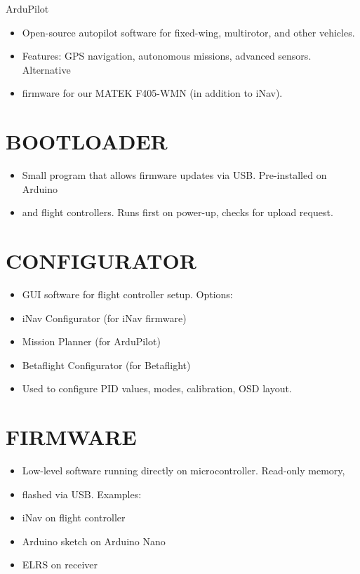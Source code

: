 \documentclass[11pt,letterpaper]{article}
\begin{document}
ArduPilot\par

\begin{itemize}
  \item Open-source autopilot software for fixed-wing, multirotor, and other vehicles.
  \item Features: GPS navigation, autonomous missions, advanced sensors. Alternative
  \item firmware for our MATEK F405-WMN (in addition to iNav).
\end{itemize}

\section{BOOTLOADER}

\begin{itemize}
  \item Small program that allows firmware updates via USB. Pre-installed on Arduino
  \item and flight controllers. Runs first on power-up, checks for upload request.
\end{itemize}

\section{CONFIGURATOR}

\begin{itemize}
  \item GUI software for flight controller setup. Options:
  \item iNav Configurator (for iNav firmware)
  \item Mission Planner (for ArduPilot)
  \item Betaflight Configurator (for Betaflight)
  \item Used to configure PID values, modes, calibration, OSD layout.
\end{itemize}

\section{FIRMWARE}

\begin{itemize}
  \item Low-level software running directly on microcontroller. Read-only memory,
  \item flashed via USB. Examples:
  \item iNav on flight controller
  \item Arduino sketch on Arduino Nano
  \item ELRS on receiver
\end{itemize}
\end{document}
